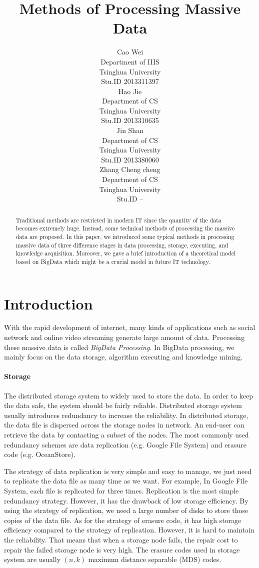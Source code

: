 \documentclass{article} %
\title{Methods of Processing Massive Data}
\author{
Cao Wei \\
Department of IIIS\\
Tsinghua University\\
Stu.ID 2013311397 \\
\And
Hao Jie \\
Department of CS\\
Tsinghua University\\
Stu.ID 2013310635 \\
\And
Jin Shan \\
Department of CS\\
Tsinghua University\\
Stu.ID 2013380060 \\
\And
Zhang Cheng cheng \\
Department of CS\\
Tsinghua University\\
Stu.ID -- \\
}
\begin{document}
\maketitle

\begin{abstract}
Traditional methods are restricted in modern IT since the quantity of the data becomes extremely huge. Instead, some technical methods of processing the massive data are proposed. In this paper, we introduced some typical methods in processing massive data of three difference stages in data processing, storage, executing, and knowledge acquisition. Moreover, we gave a brief introduction of a theoretical model based on BigData which might be a crucial model in future IT technology.
\end{abstract}

\section{Introduction}
 With the rapid development of internet, many kinds of applications such as social network and online video streaming generate large amount of data. Processing these massive data is called \emph{BigData Processing}. In BigData processing, we mainly focus on the data storage, algorithm executing and knowledge mining.
 
 \paragraph{Storage}The distributed storage system to widely used to store the data. In order to keep the data safe, the system should be fairly reliable. Distributed storage system usually introduces redundancy to increase the reliability. In distributed storage, the data file is dispersed across the storage nodes in network. An end-user can retrieve the data by contacting a subset of the nodes. The most commonly used redundancy schemes are data replication (e.g. Google File System) and erasure code (e.g. OceanStore).

The strategy of data replication is very simple and easy to manage, we just need to replicate the data file as many time as we want. For example, In Google File System, each file is replicated for three times. Replication is the most simple redundancy strategy. However, it has the drawback of low storage efficiency. By using the strategy of replication, we need a large number of disks to store those copies of the data file. As for the strategy of erasure code, it has high storage efficiency compared to the strategy of replication. However, it is hard to maintain the reliability. That means that when a storage node fails, the repair cost to repair the failed storage node is very high. The erasure codes used in storage system are usually $(n, k)$ maximum distance separable (MDS) codes.
\end{document}
